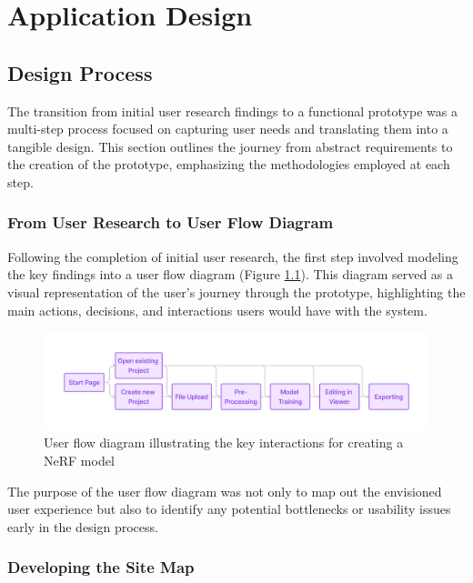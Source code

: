 %
\chapter{Application Design}
\label{sec:design}

\section{Design Process}
\label{sec:design:ux}

The transition from initial user research findings to a functional prototype was a multi-step process focused on capturing user needs and translating them into a tangible design.
This section outlines the journey from abstract requirements to the creation of the prototype, emphasizing the methodologies employed at each step.

\subsection*{From User Research to User Flow Diagram}

Following the completion of initial user research, the first step involved modeling the key findings into a user flow diagram (Figure \ref{fig:design:flow-1}).
This diagram served as a visual representation of the user's journey through the prototype, highlighting the main actions, decisions, and interactions users would have with the system.

\begin{figure}[h!]
	\includegraphics[width=\textwidth]{figures/flow-1.png}
	\caption{User flow diagram illustrating the key interactions for creating a NeRF model}
	\label{fig:design:flow-1}
\end{figure}

The purpose of the user flow diagram was not only to map out the envisioned user experience but also to identify any potential bottlenecks or usability issues early in the design process.

\subsection*{Developing the Site Map}

